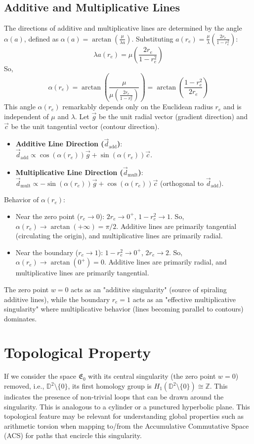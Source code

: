 \documentclass{article}
\begin{document}
\subsection{Additive and Multiplicative Lines}
The directions of additive and multiplicative lines are determined by the angle $\alpha(a)$, defined as $\alpha(a) = \arctan\left(\frac{\mu}{\lambda a}\right)$.
Substituting $a(r_e) = \frac{\mu}{\lambda} \left( \frac{2r_e}{1-r_e^2} \right)$:
$$ \lambda a(r_e) = \mu \left( \frac{2r_e}{1-r_e^2} \right) $$
So,
$$ \alpha(r_e) = \arctan\left(\frac{\mu}{\mu \left( \frac{2r_e}{1-r_e^2} \right)}\right) = \arctan\left(\frac{1-r_e^2}{2r_e}\right) $$
This angle $\alpha(r_e)$ remarkably depends only on the Euclidean radius $r_e$ and is independent of $\mu$ and $\lambda$.
Let $\vec{g}$ be the unit radial vector (gradient direction) and $\vec{c}$ be the unit tangential vector (contour direction).
\begin{itemize}
    \item \textbf{Additive Line Direction ($\vec{d}_{\text{add}}$)}: $\vec{d}_{\text{add}} \propto \cos(\alpha(r_e)) \vec{g} + \sin(\alpha(r_e)) \vec{c}$.
    \item \textbf{Multiplicative Line Direction ($\vec{d}_{\text{mult}}$)}: $\vec{d}_{\text{mult}} \propto -\sin(\alpha(r_e)) \vec{g} + \cos(\alpha(r_e)) \vec{c}$ (orthogonal to $\vec{d}_{\text{add}}$).
\end{itemize}
Behavior of $\alpha(r_e)$:
\begin{itemize}
    \item Near the zero point ($r_e \to 0$): $2r_e \to 0^+$, $1-r_e^2 \to 1$. So, $\alpha(r_e) \to \arctan(+\infty) = \pi/2$.
    Additive lines are primarily tangential (circulating the origin), and multiplicative lines are primarily radial.
    \item Near the boundary ($r_e \to 1$): $1-r_e^2 \to 0^+$, $2r_e \to 2$. So, $\alpha(r_e) \to \arctan(0^+) = 0$.
    Additive lines are primarily radial, and multiplicative lines are primarily tangential.
\end{itemize}
The zero point $w=0$ acts as an "additive singularity" (source of spiraling additive lines), while the boundary $r_e=1$ acts as an "effective multiplicative singularity" where multiplicative behavior (lines becoming parallel to contours) dominates.

\section{Topological Property}
If we consider the space $\mathfrak{E}_0$ with its central singularity (the zero point $w=0$) removed, i.e., $\mathbb{D}^2 \setminus \{0\}$, its first homology group is $H_1(\mathbb{D}^2 \setminus \{0\}) \cong \mathbb{Z}$. This indicates the presence of non-trivial loops that can be drawn around the singularity. This is analogous to a cylinder or a punctured hyperbolic plane. This topological feature may be relevant for understanding global properties such as arithmetic torsion when mapping to/from the Accumulative Commutative Space (ACS) for paths that encircle this singularity.
\end{document}
